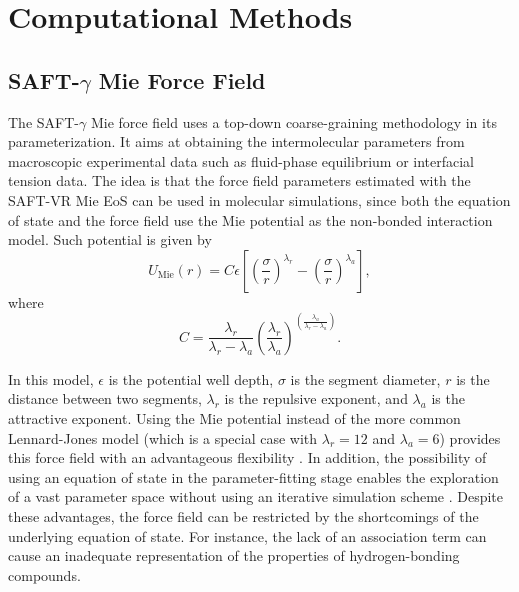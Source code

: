 \documentclass[final,12p,times,twocolumn]{elsarticle}
\begin{document}
	\section{Computational Methods}
	
	\subsection{SAFT-$\gamma$ Mie Force Field}

	The SAFT-$\gamma$ Mie force field uses a top-down coarse-graining methodology in its parameterization. It aims at obtaining the intermolecular parameters from macroscopic experimental data such as fluid-phase equilibrium or interfacial tension data. The idea is that the force field parameters estimated with the SAFT-VR Mie EoS \cite{lafitte2013} can be used in molecular simulations, since both the equation of state and the force field use the Mie potential as the non-bonded interaction model. Such potential is given by
	\begin{equation}
	\label{eqn:miepotential}
	U_\text{Mie}(r) = C \epsilon  \left[ \left(\frac{\sigma}{r} \right)^{\lambda_r} - \left(\frac{\sigma}{r} \right)^{\lambda_a} \right],
	\end{equation}
	where
	\begin{equation*}
	C = \frac{\lambda_r}{\lambda_r - \lambda_a} \left(\frac{\lambda_r}{\lambda_a} \right)^{\left( \frac{\lambda_a}{\lambda_r - \lambda_a} \right)}.
	\end{equation*}

	In this model, $\epsilon$ is the potential well depth, $\sigma$ is the segment diameter, $r$ is the distance between two segments, $\lambda_r$ is the repulsive exponent, and $\lambda_a$ is the attractive exponent. Using the Mie potential instead of the more common Lennard-Jones model (which is a special case with $\lambda_r = 12$ and $\lambda_a = 6$) provides this force field with an advantageous flexibility \cite{herdes2015}. In addition, the possibility of using an equation of state in the parameter-fitting stage enables the exploration of a vast parameter space without using an iterative simulation scheme \cite{avendano2011}. Despite these advantages, the force field can be restricted by the shortcomings of the underlying equation of state. For instance, the lack of an association term can cause an inadequate representation of the properties of hydrogen-bonding compounds.
\end{document}
